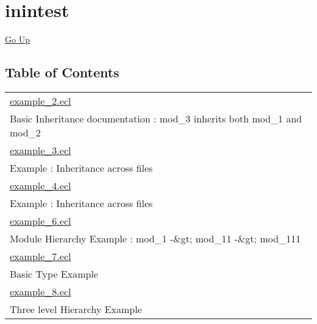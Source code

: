 \chapter*{\color{headtoc} inintest}
\hypertarget{ecldoc:toc:root/intest/inintest}{}
\hyperlink{ecldoc:toc:root/intest}{Go Up}


\section*{Table of Contents}
{\renewcommand{\arraystretch}{1.5}
\begin{longtable}{|p{\textwidth}|}
\hline
\hyperlink{ecldoc:toc:intest.inintest.example_2}{example\_2.ecl} \\
Basic Inheritance documentation : mod\_3 inherits both mod\_1 and mod\_2 \\
\hline
\hyperlink{ecldoc:toc:intest.inintest.example_3}{example\_3.ecl} \\
Example : Inheritance across files \\
\hline
\hyperlink{ecldoc:toc:intest.inintest.example_4}{example\_4.ecl} \\
Example : Inheritance across files \\
\hline
\hyperlink{ecldoc:toc:intest.inintest.example_6}{example\_6.ecl} \\
Module Hierarchy Example : mod\_1 -\&gt; mod\_11 -\&gt; mod\_111 \\
\hline
\hyperlink{ecldoc:toc:intest.inintest.example_7}{example\_7.ecl} \\
Basic Type Example \\
\hline
\hyperlink{ecldoc:toc:intest.inintest.example_8}{example\_8.ecl} \\
Three level Hierarchy Example \\
\hline
\end{longtable}
}







